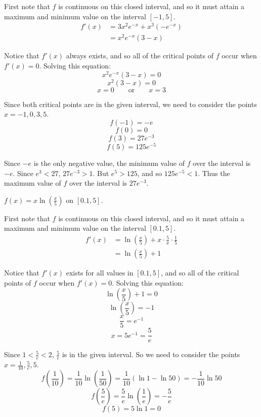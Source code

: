 \documentclass[nooutcomes]{ximera}
\renewenvironment{freeResponse}{
\ifhandout\setbox0\vbox\bgroup\else
\begin{trivlist}\item[\hskip \labelsep\bfseries Solution:\hspace{2ex}]
\fi}
{\ifhandout\egroup\else
\end{trivlist}
\fi}
\begin{document}
\begin{problem}
\begin{enumerate}
				\begin{freeResponse}
				First note that $f$ is continuous on this closed interval, and so it must attain a maximum and minimum value on the interval $[-1,5]$.
				\begin{align*}
				f'(x) &= 3x^2 e^{-x} + x^3(-e^{-x}) \\
				&= x^2 e^{-x} (3-x)
				\end{align*}
				
				Notice that $f'(x)$ always exists, and so all of the critical points of $f$ occur when $f'(x)=0$.  Solving this equation:
				$$ x^2 e^{-x} (3-x) = 0 $$
				$$ x^2 (3-x) = 0 $$
				$$ x = 0 \qquad \text{or} \qquad x=3 $$
				
				Since both critical points are in the given interval, we need to consider the points $x=-1,0,3,5$.
				$$ f(-1) = -e $$
				$$ f(0) = 0 $$
				$$ f(3) = 27e^{-3} $$
				$$ f(5) = 125 e^{-5} $$
				
				Since $-e$ is the only negative value, the minimum value of $f$ over the interval is $-e$.  Since $e^3 < 27$, $27e^{-3} > 1$.  But $e^5 > 125$, and so $125e^{-5} < 1$.  Thus the maximum value of $f$ over the interval is $27e^{-3}$.  
		
				\end{freeResponse}
				
				
				
			\item  $f(x) = x \ln \left( \frac{x}{5} \right)$ on $[0.1, 5]$.
			
				\begin{freeResponse}
				First note that $f$ is continuous on this closed interval, and so it must attain a maximum and minimum value on the interval $[0.1,5]$.
				\begin{align*}
				f'(x) &= \ln \left( \frac{x}{5} \right) + x \cdot \frac{5}{x} \cdot \frac{1}{5} \\
				&= \ln \left( \frac{x}{5} \right) + 1
				\end{align*}
				
				Notice that $f'(x)$ exists for all values in $[0.1,5]$, and so all of the critical points of $f$ occur when $f'(x)=0$.  Solving this equation:
				$$ \ln \left( \frac{x}{5} \right) + 1 = 0 $$
				$$ \ln \left( \frac{x}{5} \right) = -1 $$
				$$ \frac{x}{5} = e^{-1} $$
				$$ x = 5e^{-1} = \frac{5}{e} $$
				
				Since $1 < \frac{5}{e} < 2$, $\frac{5}{e}$ is in the given interval.  So we need to consider the points $x = \frac{1}{10}, \frac{5}{e}, 5$.
				$$ f \left( \frac{1}{10} \right) = \frac{1}{10} \ln \left( \frac{1}{50} \right)  = \frac{1}{10} \left( \ln 1 - \ln 50 \right) = -\frac{1}{10} \ln 50 $$
				$$ f \left( \frac{5}{e} \right) = \frac{5}{e} \ln \left( \frac{1}{e} \right) = - \frac{5}{e} $$
				$$ f(5) = 5 \ln 1 = 0 $$
				

\end{freeResponse}
\end{enumerate}
\end{problem}
\end{document}
